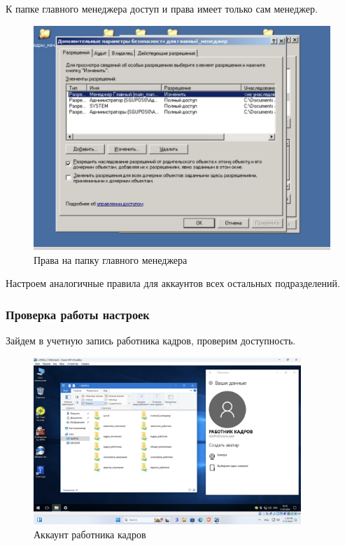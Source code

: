 \newpage
К папке главного менеджера доступ и права имеет только сам менеджер.
\begin{figure}[H]
  \centering
  \includegraphics[width=1\textwidth]{pict/prac/11}
  \caption{Права на папку главного менеджера}
  \label{fig:48}
\end{figure}
Настроем аналогичные правила для аккаунтов всех остальных подразделений.

\newpage


\subsubsection{Проверка работы настроек}

Зайдем в учетную запись работника кадров, проверим доступность.
\begin{figure}[H]
  \centering
  \includegraphics[width=0.9\textwidth]{pict/prac/25}
  \caption{Аккаунт работника кадров}
  \label{fig:24}
\end{figure}

